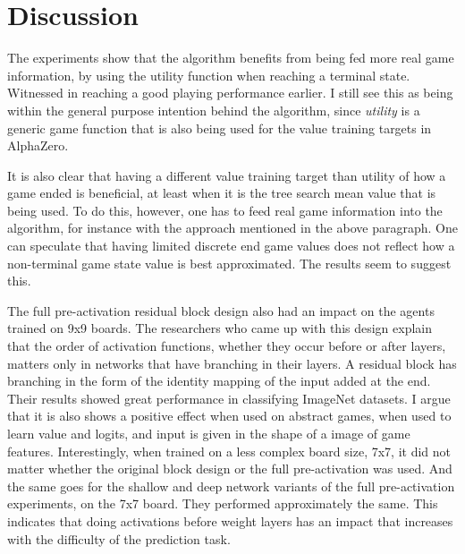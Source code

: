\chapter{Discussion}
The experiments show that the algorithm benefits from being fed more real game information, by using the utility function when reaching a terminal state. Witnessed in reaching a good playing performance earlier. I still see this as being within the general purpose intention behind the algorithm, since \textit{utility} is a generic game function that is also being used for the value training targets in AlphaZero.

It is also clear that having a different value training target than utility of how a game ended is beneficial, at least when it is the tree search mean value that is being used. To do this, however, one has to feed real game information into the algorithm, for instance with the approach mentioned in the above paragraph. One can speculate that having limited discrete end game values does not reflect how a non-terminal game state value is best approximated. The results seem to suggest this.

The full pre-activation residual block design also had an impact on the agents trained on 9x9 boards. The researchers who came up with this design explain that the order of activation functions, whether they occur before or after layers, matters only in networks that have branching in their layers\cite{He2016}. A residual block has branching in the form of the identity mapping of the input added at the end. Their results showed great performance in classifying ImageNet datasets. I argue that it is also shows a positive effect when used on abstract games, when used to learn value and logits, and input is given in the shape of a image of game features. Interestingly, when trained on a less complex board size, 7x7, it did not matter whether the original block design or the full pre-activation was used. And the same goes for the shallow and deep network variants of the full pre-activation experiments, on the 7x7 board. They performed approximately the same. This indicates that doing activations before weight layers has an impact that increases with the difficulty of the prediction task.

